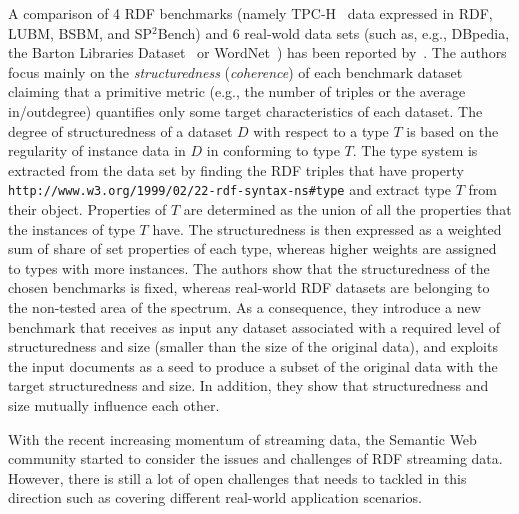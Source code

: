 A comparison of 4 RDF benchmarks (namely TPC-H~\cite{TPC-H} data expressed in RDF, LUBM, BSBM, and SP$^2$Bench) and 6 real-wold data sets (such as, e.g.,  DBpedia, the Barton Libraries Dataset~\cite{barton-benchmark} or
WordNet~\cite{Miller:1995:WLD:219717.219748}) has been reported by~\cite{Duan:2011:AOC:1989323.1989340}. The authors focus mainly on the  \emph{structuredness} (\emph{coherence}) of each benchmark dataset claiming that a primitive metric (e.g., the number of triples or the average in/outdegree) quantifies only some target characteristics of each dataset. The degree of structuredness of a dataset $D$ with respect to a type $T$ is based on  the regularity of instance data in $D$ in conforming to type $T$. The type system is extracted from the data set by finding the RDF triples that have property  \texttt{http://www.w3.org/1999/02/22-rdf-syntax-ns\#type} and extract type $T$ from their object. Properties of $T$ are determined as the union of all the properties that the instances of type $T$ have. The structuredness is then expressed as a weighted sum of share of set properties of each type, whereas higher weights are assigned to types with more instances. The authors show that the structuredness of the chosen benchmarks is fixed, whereas real-world RDF datasets are belonging to the non-tested area of the spectrum. As a consequence, they introduce a new benchmark that receives as input any dataset associated with a required level of structuredness and size (smaller than the size of the original data), and exploits the input documents as a seed to produce a subset of the original data with the target structuredness and size. In addition, they show that structuredness and size mutually influence each other. 

With the recent increasing momentum of streaming data, the Semantic Web community started to consider the issues and challenges of RDF streaming data. However, there is still a lot of open challenges that needs to tackled in this direction such as covering different real-world application scenarios. 
